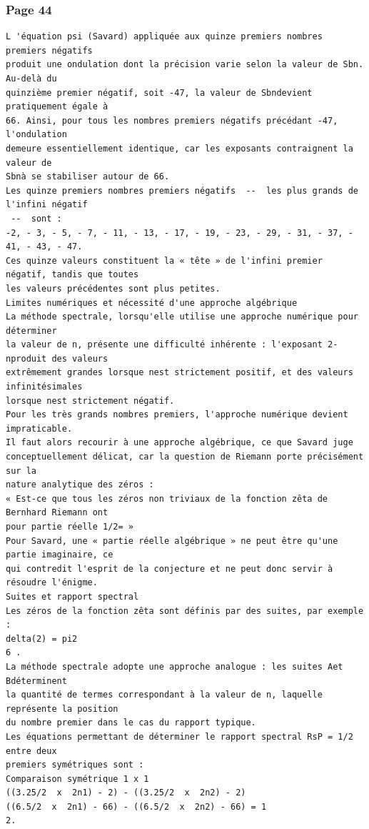 \documentclass[11pt,a4paper]{article}
\begin{document}
\subsubsection*{Page 44}
\begin{Verbatim}[fontsize=\footnotesize]
L 'équation psi (Savard) appliquée aux quinze premiers nombres premiers négatifs 
produit une ondulation dont la précision varie selon la valeur de Sbn. Au-delà du 
quinzième premier négatif, soit -47, la valeur de Sbndevient pratiquement égale à 
66. Ainsi, pour tous les nombres premiers négatifs précédant -47, l'ondulation 
demeure essentiellement identique, car les exposants contraignent la valeur de 
Sbnà se stabiliser autour de 66. 
Les quinze premiers nombres premiers négatifs  --  les plus grands de l'infini négatif 
 --  sont : 
-2, - 3, - 5, - 7, - 11, - 13, - 17, - 19, - 23, - 29, - 31, - 37, - 41, - 43, - 47. 
Ces quinze valeurs constituent la « tête » de l'infini premier négatif, tandis que toutes 
les valeurs précédentes sont plus petites. 
Limites numériques et nécessité d'une approche algébrique 
La méthode spectrale, lorsqu'elle utilise une approche numérique pour déterminer 
la valeur de n, présente une difficulté inhérente : l'exposant 2-nproduit des valeurs 
extrêmement grandes lorsque nest strictement positif, et des valeurs infinitésimales 
lorsque nest strictement négatif. 
Pour les très grands nombres premiers, l'approche numérique devient impraticable. 
Il faut alors recourir à une approche algébrique, ce que Savard juge 
conceptuellement délicat, car la question de Riemann porte précisément sur la 
nature analytique des zéros : 
« Est-ce que tous les zéros non triviaux de la fonction zêta de Bernhard Riemann ont 
pour partie réelle 1/2= » 
Pour Savard, une « partie réelle algébrique » ne peut être qu'une partie imaginaire, ce 
qui contredit l'esprit de la conjecture et ne peut donc servir à résoudre l'énigme. 
Suites et rapport spectral 
Les zéros de la fonction zêta sont définis par des suites, par exemple : 
delta(2) = pi2
6 . 
La méthode spectrale adopte une approche analogue : les suites Aet Bdéterminent 
la quantité de termes correspondant à la valeur de n, laquelle représente la position 
du nombre premier dans le cas du rapport typique. 
Les équations permettant de déterminer le rapport spectral RsP = 1/2 entre deux
premiers symétriques sont : 
Comparaison symétrique 1 x 1 
((3.25/2  x  2n1) - 2) - ((3.25/2  x  2n2) - 2)
((6.5/2  x  2n1) - 66) - ((6.5/2  x  2n2) - 66) = 1
2. 
\end{Verbatim}
\medskip
\end{document}
